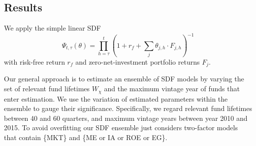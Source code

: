 \documentclass[12pt]{article}
\begin{document}
\subsection{Results}

We apply the simple linear SDF
\begin{equation}
\label{eq:SDF}
\Psi_{t,\tau} (\theta) = \prod_{h=\tau}^{t} \left( 1 + r_f + \sum_{j} \theta_{j,h} \cdot F_{j,h} \right)^{-1}
\end{equation}
with risk-free return $r_f$ and zero-net-investment portfolio returns $F_j$.

Our general approach is to estimate an ensemble of SDF models by varying the set of relevant fund lifetimes $W_{\chi}$ and the maximum vintage year of funds that enter estimation.
We use the variation of estimated parameters within the ensemble to gauge their significance.
Specifically, we regard relevant fund lifetimes between 40 and 60 quarters, and maximum vintage years between year 2010 and 2015.
To avoid overfitting our SDF ensemble just considers two-factor models that contain \{MKT\} and \{ME or IA or ROE or EG\}.
\end{document}
